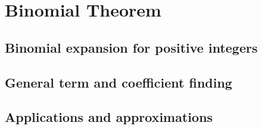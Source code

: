 
\section{Binomial Theorem}

\subsection{Binomial expansion for positive integers}


\subsection{General term and coefficient finding}


\subsection{Applications and approximations}

